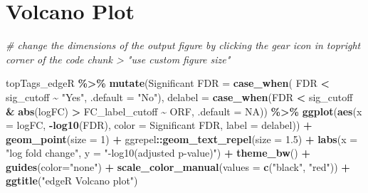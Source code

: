 \documentclass[
]{book}
\newenvironment{Shaded}{\begin{snugshade}}{\end{snugshade}}
\newcommand{\AttributeTok}[1]{\textcolor[rgb]{0.13,0.29,0.53}{#1}}
\newcommand{\CommentTok}[1]{\textcolor[rgb]{0.56,0.35,0.01}{\textit{#1}}}
\newcommand{\ConstantTok}[1]{\textcolor[rgb]{0.56,0.35,0.01}{#1}}
\newcommand{\DecValTok}[1]{\textcolor[rgb]{0.00,0.00,0.81}{#1}}
\newcommand{\FloatTok}[1]{\textcolor[rgb]{0.00,0.00,0.81}{#1}}
\newcommand{\FunctionTok}[1]{\textcolor[rgb]{0.13,0.29,0.53}{\textbf{#1}}}
\newcommand{\NormalTok}[1]{#1}
\newcommand{\OtherTok}[1]{\textcolor[rgb]{0.56,0.35,0.01}{#1}}
\newcommand{\SpecialCharTok}[1]{\textcolor[rgb]{0.81,0.36,0.00}{\textbf{#1}}}
\newcommand{\StringTok}[1]{\textcolor[rgb]{0.31,0.60,0.02}{#1}}
\begin{document}
\hypertarget{volcano-plot}{%
\section{Volcano Plot}\label{volcano-plot}}

\begin{Shaded}
\begin{Highlighting}[]
\CommentTok{\# change the dimensions of the output figure by clicking the gear icon in topright corner of the code chunk \textgreater{} "use custom figure size"}


\NormalTok{topTags\_edgeR }\SpecialCharTok{\%\textgreater{}\%}
  \FunctionTok{mutate}\NormalTok{(}\StringTok{\textasciigrave{}}\AttributeTok{Significant FDR}\StringTok{\textasciigrave{}} \OtherTok{=} \FunctionTok{case\_when}\NormalTok{(}
\NormalTok{        FDR }\SpecialCharTok{\textless{}}\NormalTok{ sig\_cutoff }\SpecialCharTok{\textasciitilde{}} \StringTok{"Yes"}\NormalTok{,}
        \AttributeTok{.default =} \StringTok{"No"}\NormalTok{),}
        \AttributeTok{delabel =} \FunctionTok{case\_when}\NormalTok{(FDR }\SpecialCharTok{\textless{}}\NormalTok{ sig\_cutoff }\SpecialCharTok{\&} \FunctionTok{abs}\NormalTok{(logFC) }\SpecialCharTok{\textgreater{}}\NormalTok{ FC\_label\_cutoff }\SpecialCharTok{\textasciitilde{}}\NormalTok{ ORF,}
                             \AttributeTok{.default =} \ConstantTok{NA}\NormalTok{)) }\SpecialCharTok{\%\textgreater{}\%}
  \FunctionTok{ggplot}\NormalTok{(}\FunctionTok{aes}\NormalTok{(}\AttributeTok{x =}\NormalTok{ logFC, }\SpecialCharTok{{-}}\FunctionTok{log10}\NormalTok{(FDR), }\AttributeTok{color =} \StringTok{\textasciigrave{}}\AttributeTok{Significant FDR}\StringTok{\textasciigrave{}}\NormalTok{, }\AttributeTok{label =}\NormalTok{ delabel)) }\SpecialCharTok{+}
  \FunctionTok{geom\_point}\NormalTok{(}\AttributeTok{size =} \DecValTok{1}\NormalTok{) }\SpecialCharTok{+}
\NormalTok{  ggrepel}\SpecialCharTok{::}\FunctionTok{geom\_text\_repel}\NormalTok{(}\AttributeTok{size =} \FloatTok{1.5}\NormalTok{) }\SpecialCharTok{+}
  \FunctionTok{labs}\NormalTok{(}\AttributeTok{x =} \StringTok{"log fold change"}\NormalTok{, }\AttributeTok{y =} \StringTok{"{-}log10(adjusted p{-}value)"}\NormalTok{) }\SpecialCharTok{+}
  \FunctionTok{theme\_bw}\NormalTok{() }\SpecialCharTok{+}
  \FunctionTok{guides}\NormalTok{(}\AttributeTok{color=}\StringTok{"none"}\NormalTok{) }\SpecialCharTok{+}
  \FunctionTok{scale\_color\_manual}\NormalTok{(}\AttributeTok{values =} \FunctionTok{c}\NormalTok{(}\StringTok{"black"}\NormalTok{, }\StringTok{"red"}\NormalTok{)) }\SpecialCharTok{+}
  \FunctionTok{ggtitle}\NormalTok{(}\StringTok{"edgeR Volcano plot"}\NormalTok{)}
\end{Highlighting}
\end{Shaded}
\end{document}
